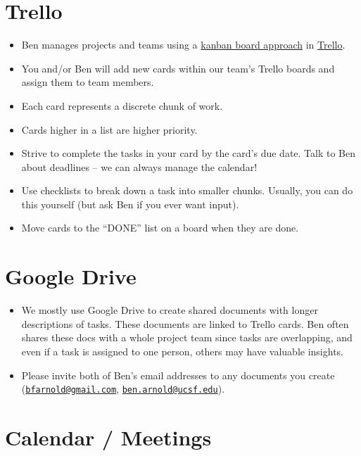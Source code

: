 \documentclass[
]{book}
\providecommand{\tightlist}{%
  \setlength{\itemsep}{0pt}\setlength{\parskip}{0pt}}
\begin{document}
\section{Trello}\label{trello}

\begin{itemize}
\tightlist
\item
  Ben manages projects and teams using a \href{https://www.atlassian.com/agile/kanban/boards}{kanban board approach} in \href{https://www.trello.com}{Trello}.
\item
  You and/or Ben will add new cards within our team's Trello boards and assign them to team members.
\item
  Each card represents a discrete chunk of work.
\item
  Cards higher in a list are higher priority.
\item
  Strive to complete the tasks in your card by the card's due date. Talk to Ben about deadlines -- we can always manage the calendar!
\item
  Use checklists to break down a task into smaller chunks. Usually, you can do this yourself (but ask Ben if you ever want input).
\item
  Move cards to the ``DONE'' list on a board when they are done.
\end{itemize}

\section{Google Drive}\label{google-drive}

\begin{itemize}
\tightlist
\item
  We mostly use Google Drive to create shared documents with longer descriptions of tasks. These documents are linked to Trello cards. Ben often shares these docs with a whole project team since tasks are overlapping, and even if a task is assigned to one person, others may have valuable insights.
\item
  Please invite both of Ben's email addresses to any documents you create (\href{mailto:bfarnold@gmail.com}{\nolinkurl{bfarnold@gmail.com}}, \href{mailto:ben.arnold@ucsf.edu}{\nolinkurl{ben.arnold@ucsf.edu}}).
\end{itemize}

\section{Calendar / Meetings}\label{calendar-meetings}
\end{document}
